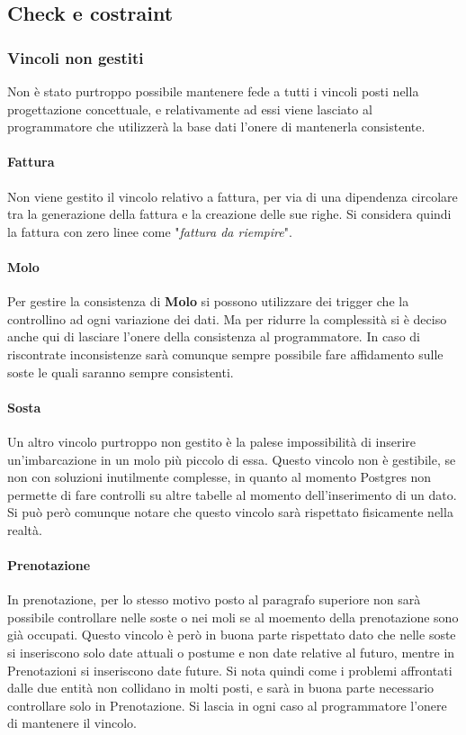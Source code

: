 \subsection{Check e costraint}

\subsubsection{Vincoli non gestiti}
Non è stato purtroppo possibile mantenere fede a tutti i vincoli posti nella progettazione concettuale, e relativamente ad essi viene lasciato al programmatore che utilizzerà la base dati l'onere di mantenerla consistente.

\paragraph{Fattura}
Non viene gestito il vincolo relativo a fattura, per via di una dipendenza circolare tra la generazione della fattura e la creazione delle sue righe. Si considera quindi la fattura con zero linee come "\textit{fattura da riempire}".

\paragraph{Molo}
Per gestire la consistenza di \textbf{Molo} si possono utilizzare dei trigger che la controllino ad ogni variazione dei dati. Ma per ridurre la complessità si è deciso anche qui di lasciare l'onere della consistenza al programmatore. In caso di riscontrate inconsistenze sarà comunque sempre possibile fare affidamento sulle soste le quali saranno sempre consistenti.

\paragraph{Sosta}
Un altro vincolo purtroppo non gestito è la palese impossibilità di inserire un'imbarcazione in un molo più piccolo di essa. Questo vincolo non è gestibile, se non con soluzioni inutilmente complesse, in quanto al momento Postgres non permette di fare controlli su altre tabelle al momento dell'inserimento di un dato. Si può però comunque notare che questo vincolo sarà rispettato fisicamente nella realtà.

\paragraph{Prenotazione} In prenotazione, per lo stesso motivo posto al paragrafo superiore non sarà possibile controllare nelle soste o nei moli se al moemento della prenotazione sono già occupati. Questo vincolo è però in buona parte rispettato dato che nelle soste si inseriscono solo date attuali o postume e non date relative al futuro, mentre in Prenotazioni si inseriscono date future. Si nota quindi come i problemi affrontati dalle due entità non collidano in molti posti, e sarà in buona parte necessario controllare solo in Prenotazione. Si lascia in ogni caso al programmatore l'onere di mantenere il vincolo.

